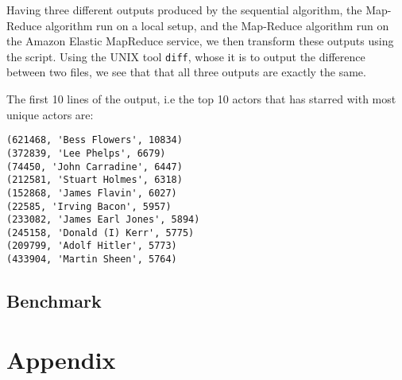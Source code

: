 \documentclass[a4paper,11pt]{article}
\begin{document}
Having three different outputs produced by the sequential algorithm, the Map-Reduce algorithm run on a local setup, and the Map-Reduce algorithm run on the Amazon Elastic MapReduce service, we then transform these outputs using the script.
Using the UNIX tool \texttt{diff}, whose it is to output the difference between two files, we see that that all three outputs are exactly the same.

The first 10 lines of the output, i.e the top 10 actors that has starred with most unique actors are: 

\begin{verbatim}
(621468, 'Bess Flowers', 10834)
(372839, 'Lee Phelps', 6679)
(74450, 'John Carradine', 6447)
(212581, 'Stuart Holmes', 6318)
(152868, 'James Flavin', 6027)
(22585, 'Irving Bacon', 5957)
(233082, 'James Earl Jones', 5894)
(245158, 'Donald (I) Kerr', 5775)
(209799, 'Adolf Hitler', 5773)
(433904, 'Martin Sheen', 5764)
\end{verbatim}





\subsection{Benchmark}

\section{Appendix}
\end{document}

